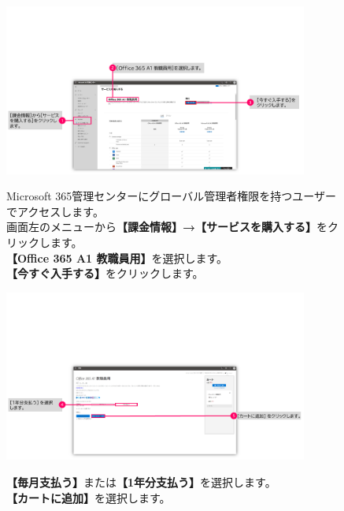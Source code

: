 \begin{figure}[h]
    \begin{minipage}{0.6\textwidth}
        \vspace{-2cm}
        \includegraphics[width=10cm]{figures/O365A1_buy00.png}
    \end{minipage}
    \begin{minipage}{0.4\textwidth}
       Microsoft 365管理センターにグローバル管理者権限を持つユーザーでアクセスします。\\
       画面左のメニューから\textbf{【課金情報】→【サービスを購入する】}をクリックします。\\
       \textbf{【Office 365 A1 教職員用】}を選択します。\\
       \textbf{【今すぐ入手する】}をクリックします。
    \end{minipage}
\end{figure}

\begin{figure}[h]
    \begin{minipage}{0.6\textwidth}
        \vspace{-1.5cm}
        \includegraphics[width=10cm]{figures/O365A1_buy01.png}
    \end{minipage}
    \begin{minipage}{0.4\textwidth}
        \textbf{【毎月支払う】}または\textbf{【1年分支払う】}を選択します。\\
        \textbf{【カートに追加】}を選択します。
    \end{minipage}
\end{figure}

